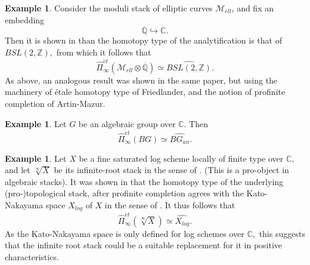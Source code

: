 \documentclass[12pt]{amsart}
\theoremstyle{definition}
\newtheorem{example}[dummy]{Example}
\newcommand{\et}{\acute{e}t}
\renewcommand{\i}{\infty}
\begin{document}
\begin{example}
Consider the moduli stack of elliptic curves $\mathcal{M}_{ell}$, and fix an embedding $$\overline{\mathbb{Q}}\hookrightarrow \mathbb{C}.$$ Then it is shown in \cite{polarised} than the homotopy type of the analytification is that of $BSL\left(2,\mathbb{Z}\right),$ from which it follows that $$\widehat{\Pi}^{\et}_\i\left(\mathcal{M}_{ell} \otimes \overline{\mathbb{Q}}\right) \simeq \widehat{BSL\left(2,\mathbb{Z}\right)}.$$ As above, an analogous result was shown in the same paper, but using the machinery of  \'etale homotopy type of Friedlander, and the notion of profinite completion of Artin-Mazur.
\end{example}

\begin{example}
Let $G$ be an algebraic group over $\mathbb{C}$. Then
 $$\widehat{\Pi}^{\et}_\i\left(BG\right) \simeq \widehat{BG_{an}}.$$
\end{example}

\begin{example}
Let $X$ be a fine saturated log scheme locally of finite type over $\mathbb{C},$ and let $\sqrt[\i]{X}$ be its infinite-root stack in the sense of \cite{TV}. (This is a pro-object in algebraic stacks). It was shown in \cite{knhom} that the homotopy type of the underlying (pro-)topological stack, after profinite completion agrees with the Kato-Nakayama space $X_{log}$ of $X$ in the sense of \cite{KN}. It thus follows that $$\widehat{\Pi}^{\et}_\i\left(\sqrt[\i]{X}\right) \simeq \widehat{X_{log}}.$$ As the Kato-Nakayama space is only defined for log schemes over $\mathbb{C},$ this suggests that the infinite root stack could be a suitable replacement for it in positive characteristics.
\end{example}



\end{document}
